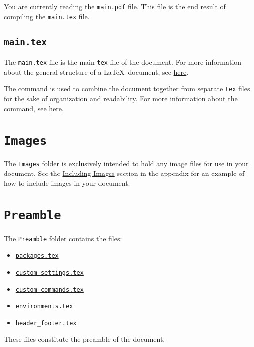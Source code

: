 You are currently reading the \texttt{main.pdf} file. This file is the end result of compiling the \hyperref[sec:main.tex]{\texttt{main.tex}} file.

\subsection{\texttt{main.tex}}
\label{sec:main.tex}



The \texttt{main.tex} file is the main \texttt{tex} file of the document.  For more information about the general structure of a \LaTeX\ document, see \href{https://en.wikibooks.org/wiki/LaTeX/Document_Structure#Global_structure}{here}. 

The \lstinline|| command is used to combine the document together from separate \texttt{tex} files for the sake of organization and readability. For more information about the \lstinline|| command, see \href{https://en.wikibooks.org/wiki/LaTeX/Modular_Documents#Getting_LaTeX_to_process_multiple_files}{here}.

\section{\texttt{Images}}
\label{sec:images}

The \texttt{Images} folder is exclusively intended to hold any image files for use in your document. See the \hyperref[sec:including_images]{Including Images} section in the appendix for an example of how to include images in your document.

\section{\texttt{Preamble}}
\label{sec:preamble}

The \texttt{Preamble} folder contains the files:
\begin{itemize}
    \item \hyperref[sec:packages.tex]{\texttt{packages.tex}}
    \item \hyperref[sec:custom_settings.tex]{\texttt{custom\_settings.tex}}
    \item \hyperref[sec:custom_commands.tex]{\texttt{custom\_commands.tex}}
    \item \hyperref[sec:environments.tex]{\texttt{environments.tex}}
    \item \hyperref[sec:header_footer.tex]{\texttt{header\_footer.tex}}
\end{itemize}
These files constitute the preamble of the document. 

